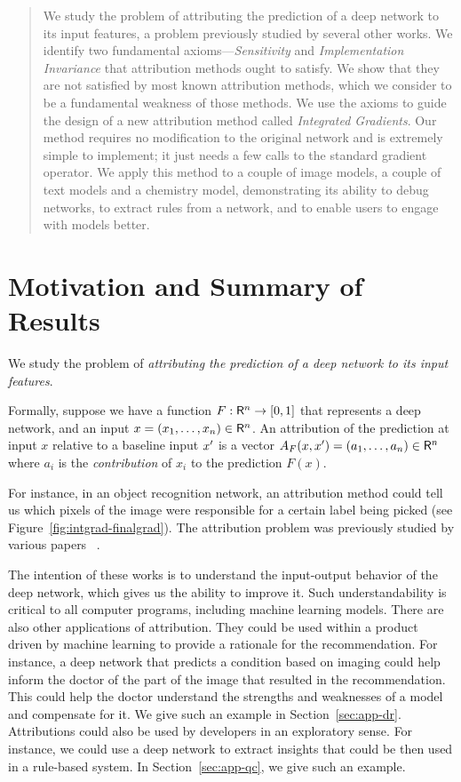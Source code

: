 
\begin{abstract}
  We study the problem of attributing the prediction of a deep network
  to its input features, a problem previously studied by several other
  works. We identify two fundamental axioms---\emph{Sensitivity} and
  \emph{Implementation Invariance} that attribution methods ought to
  satisfy. We show that they are not satisfied by most known
  attribution methods, which we consider to be a fundamental weakness
  of those methods. We use the axioms to guide the design of a new
  attribution method called \emph{Integrated Gradients}. Our method
  requires no modification to the original network and is extremely
  simple to implement; it just needs a few calls to the standard
  gradient operator. We apply this method to a couple of image models,
  a couple of text models and a chemistry model, demonstrating its
  ability to debug networks, to extract rules from a network, and
  to enable users to engage with models better.
\end{abstract}

\section{Motivation and Summary of Results}\label{sec:intro}

We study the problem of \emph{attributing the prediction of a deep
  network to its input features}.
\begin{definition}
  Formally, suppose we have a function $F: \mathsf{R}^n \rightarrow [0,1]$
  that represents a deep network, and an input $x = (x_1,\ldots,x_n) \in \mathsf{R}^n$.
  An attribution of the prediction at input $x$ relative to a baseline
  input $x'$ is a vector $A_F(x, x') = (a_1,\ldots,a_n) \in \mathsf{R}^n$
  where $a_i$ is the \emph{contribution} of $x_i$ to the
  prediction $F(x)$.
\end{definition}
\newpage 
For instance, in an object
recognition network, an attribution method could tell us which pixels
of the image were responsible for a certain label being picked (see
Figure~\ref{fig:intgrad-finalgrad}). The attribution problem was
previously studied by various papers
~\cite{BSHKHM10,SVZ13,SGSK16,BMBMS16,SDBR14}.

The intention of these works is to understand the input-output
behavior of the deep network, which gives us the ability to improve
it.  Such understandability is critical to all computer programs,
including machine learning models. There are also other applications
of attribution. They could be used within a product driven by machine
learning to provide a rationale for the recommendation. For instance,
a deep network that predicts a condition based on imaging could help
inform the doctor of the part of the image that resulted in the
recommendation. This could help the doctor understand the strengths
and weaknesses of a model and compensate for it. We give such an
example in Section~\ref{sec:app-dr}. Attributions could also be used
by developers in an exploratory sense. For instance, we could use a
deep network to extract insights that could be then used in a rule-based
system. In Section~\ref{sec:app-qc}, we give such an example.

